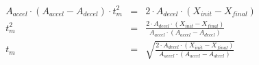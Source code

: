 \documentclass[11pt]{article} %
\begin{document}
\begin{eqnarray}
A_{accel} \cdot (A_{accel} - A_{decel})  \cdot t_m^2  & = &  2 \cdot A_{decel} \cdot (X_{init} - X_{final}) \nonumber \\
t_m^2  & = &  \frac{2 \cdot A_{decel} \cdot (X_{init} - X_{final})}{A_{accel} \cdot (A_{accel} - A_{decel})} \nonumber \\
t_m  & = & \sqrt{\frac{2 \cdot A_{decel} \cdot (X_{init} - X_{final})}{A_{accel} \cdot (A_{accel} - A_{decel})}} \label{eq:case2_reduction3}
\end{eqnarray}


%
%
%
%
%
%
%
%
%
%
%
\end{document}
